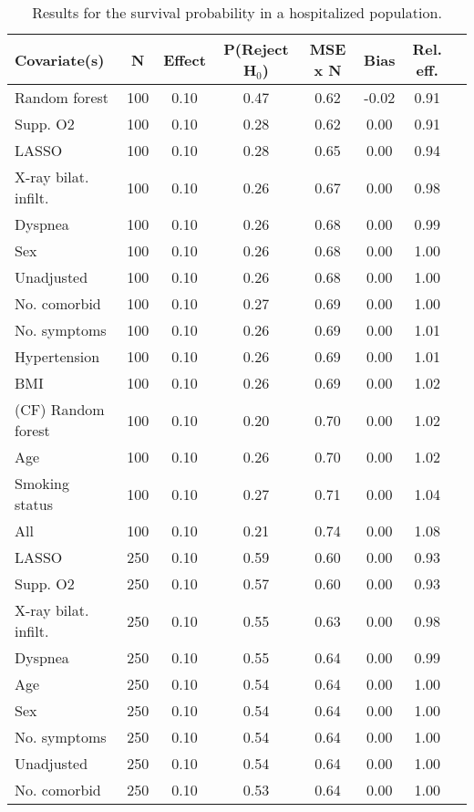 \documentclass{article}
\begin{document}
{\tabcolsep=6pt  %
\begin{longtable}{lccccccc}
\caption{Results for the survival probability in a hospitalized population.} \\
Covariate(s) & N & Effect & P(Reject H$_0$) & MSE x N & Bias & Rel. eff.\\ \midrule
Random forest & 100 & 0.10 & 0.47 & 0.62 & -0.02 & 0.91 \\ 
Supp. O2 & 100 & 0.10 & 0.28 & 0.62 &  0.00 & 0.91 \\ 
LASSO & 100 & 0.10 & 0.28 & 0.65 &  0.00 & 0.94 \\ 
X-ray bilat. infilt. & 100 & 0.10 & 0.26 & 0.67 &  0.00 & 0.98 \\ 
Dyspnea & 100 & 0.10 & 0.26 & 0.68 &  0.00 & 0.99 \\ 
Sex & 100 & 0.10 & 0.26 & 0.68 &  0.00 & 1.00 \\ 
Unadjusted & 100 & 0.10 & 0.26 & 0.68 &  0.00 & 1.00 \\ 
No. comorbid & 100 & 0.10 & 0.27 & 0.69 &  0.00 & 1.00 \\ 
No. symptoms & 100 & 0.10 & 0.26 & 0.69 &  0.00 & 1.01 \\ 
Hypertension & 100 & 0.10 & 0.26 & 0.69 &  0.00 & 1.01 \\ 
BMI & 100 & 0.10 & 0.26 & 0.69 &  0.00 & 1.02 \\ 
(CF) Random forest & 100 & 0.10 & 0.20 & 0.70 &  0.00 & 1.02 \\ 
Age & 100 & 0.10 & 0.26 & 0.70 &  0.00 & 1.02 \\ 
Smoking status & 100 & 0.10 & 0.27 & 0.71 &  0.00 & 1.04 \\ 
All & 100 & 0.10 & 0.21 & 0.74 &  0.00 & 1.08 \\ \midrule() 
LASSO & 250 & 0.10 & 0.59 & 0.60 &  0.00 & 0.93 \\ 
Supp. O2 & 250 & 0.10 & 0.57 & 0.60 &  0.00 & 0.93 \\ 
X-ray bilat. infilt. & 250 & 0.10 & 0.55 & 0.63 &  0.00 & 0.98 \\ 
Dyspnea & 250 & 0.10 & 0.55 & 0.64 &  0.00 & 0.99 \\ 
Age & 250 & 0.10 & 0.54 & 0.64 &  0.00 & 1.00 \\ 
Sex & 250 & 0.10 & 0.54 & 0.64 &  0.00 & 1.00 \\ 
No. symptoms & 250 & 0.10 & 0.54 & 0.64 &  0.00 & 1.00 \\ 
Unadjusted & 250 & 0.10 & 0.54 & 0.64 &  0.00 & 1.00 \\ 
No. comorbid & 250 & 0.10 & 0.53 & 0.64 &  0.00 & 1.00 \\ 

\end{longtable}}
\end{document}
